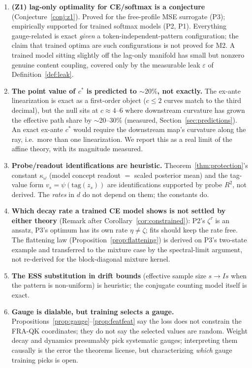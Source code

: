 \documentclass{article}
\begin{document}
\begin{enumerate}
    \item \textbf{(Z1) lag-only optimality for CE/softmax is a conjecture} (Conjecture~\ref{conj:z1}). Proved for the free-profile MSE surrogate (P3); empirically supported for trained softmax models (P2, P1). Everything gauge-related is exact \emph{given} a token-independent-pattern configuration; the claim that trained optima are such configurations is not proved for M2. A trained model sitting slightly off the lag-only manifold has small but nonzero genuine content coupling, covered only by the measurable leak $\varepsilon$ of Definition~\ref{def:leak}.
    \item \textbf{The point value of $c^*$ is predicted to $\sim20\%$, not exactly.} The ex-ante linearization is exact as a first-order object ($c \le 2$ curves match to the third decimal), but the null sits at $c \approx 4$--$6$ where downstream curvature has grown the effective path share by $\sim$20--30\% (measured, Section~\ref{sec:predictions}). An exact ex-ante $c^*$ would require the downstream map's curvature along the ray, i.e.\ more than one linearization. We report this as a real limit of the affine theory, with its magnitude measured.
    \item \textbf{Probe/readout identifications are heuristic.} Theorem~\ref{thm:protection}'s constant $\kappa_\omega$ (model concept readout $=$ scaled posterior mean) and the tag-value form $v_s = \psi(\mathrm{tag}(z_s))$ are identifications supported by probe $R^2$, not derived. The \emph{rates} in $d$ do not depend on them; the constants do.
    \item \textbf{Which decay rate a trained CE model shows is not settled by either theory} (Remark after Corollary~\ref{cor:constrained}): P2's $\zeta^\tau$ is an ansatz, P3's optimum has its own rate $\eta \ne \zeta$; fits should keep the rate free. The flattening law (Proposition~\ref{prop:flattening}) is derived on P3's two-state example and transferred to the mixture case by the spectral-limit argument, not re-derived for the block-diagonal mixture kernel.
    \item \textbf{The ESS substitution in drift bounds} (effective sample size $s \to Is$ when the pattern is non-uniform) is heuristic; the conjugate counting model itself is exact.
    \item \textbf{Gauge is dialable, but training selects a gauge.} Propositions~\ref{prop:gauge}--\ref{prop:featfeat} say the loss does not constrain the FRA-QK coordinates; they do not say the selected values are random. Weight decay and dynamics presumably pick systematic gauges; interpreting them causally is the error the theorems license, but characterizing \emph{which} gauge training picks is open.

\end{enumerate}
\end{document}
